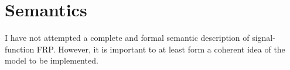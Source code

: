 \chapter{Semantics}
\label{chapter:Semantics}

I have not attempted a complete and formal semantic description of
signal-function FRP. However, it is important to at least form a coherent idea
of the model to be implemented. 
